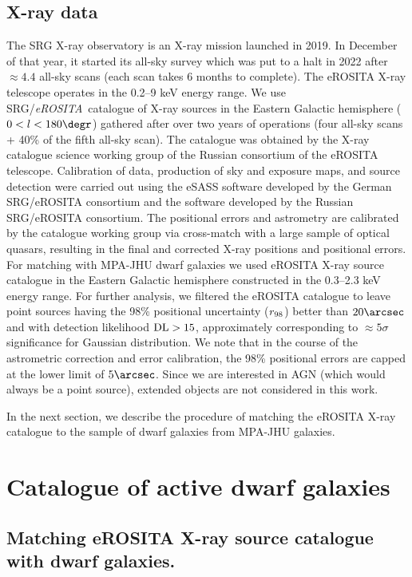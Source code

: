 \documentclass[fleqn,usenatbib]{mnras}
\newcommand{\ero}{\textit{eROSITA}}
\begin{document}
\subsection{X-ray data}
\label{sect:data:xray}
The SRG X-ray observatory \citep{Sunyaev2021} is an X-ray mission launched in 2019. In December of that year, it started its all-sky survey which was put to a halt in 2022 after $\approx4.4$ all-sky scans (each scan takes 6 months to complete). The eROSITA X-ray telescope \citep{Predehl2021} operates in the 0.2--9 keV energy range. We use SRG/\ero~catalogue of X-ray sources in the Eastern Galactic hemisphere ($0<l<180\degr$) gathered after over two years of operations (four all-sky scans + 40\% of the fifth all-sky scan). The catalogue was obtained by the X-ray catalogue science working group of the Russian consortium of the eROSITA telescope. Calibration of data, production of sky and exposure maps, and source detection  were carried out using the eSASS software developed by the German SRG/eROSITA consortium \citep{Brunner2022} and the software developed by the Russian SRG/eROSITA consortium. The positional errors and astrometry are calibrated by the catalogue  working group via cross-match with a large sample of optical quasars, resulting in the final and corrected X-ray positions and positional errors. For matching with MPA-JHU dwarf galaxies we used eROSITA X-ray source catalogue in the Eastern Galactic hemisphere constructed in the 0.3--2.3 keV energy range. For further analysis, we filtered the eROSITA catalogue to leave point sources having the 98\% positional uncertainty ($r_{\rm 98}$) better than $20\arcsec$ and with detection likelihood ${\rm DL}>15$, approximately corresponding to $\approx 5\sigma$ significance for Gaussian distribution. We note that in the course of the astrometric correction and error calibration, the 98\% positional errors are capped at the lower limit of $5\arcsec$. Since we are interested in AGN (which would always be a point source), extended objects are not considered in this work. 


In the next section, we describe the procedure of matching the eROSITA X-ray catalogue to the sample of dwarf galaxies from MPA-JHU galaxies.



\section{Catalogue of active dwarf galaxies}
\label{sect:catalog}
\subsection{Matching eROSITA X-ray source catalogue with dwarf galaxies.}
\label{sect:catalog:cross-match}
\end{document}
